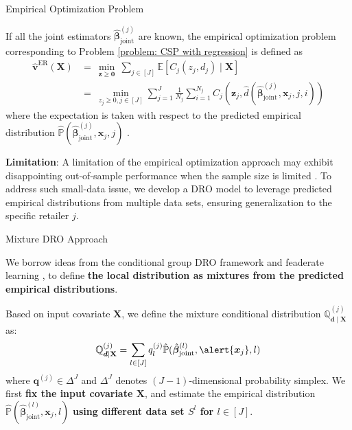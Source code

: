 \documentclass{beamer}
\newcommand{\mb}[1]{{\mathbf{#1}}}
\newcommand{\txrd}[1]{{\textcolor{sintefred}{\textbf{#1}}}}
\newcommand{\bbp}{\mathbb{P}}
\newcommand{\bbq}{\mathbb{Q}}
\begin{document}
\begin{frame}{Empirical Optimization Problem}

If all the joint estimators $\hat{\bm \beta}_{\text{joint}}^{(j)}$ are known, the empirical optimization problem corresponding to Problem \eqref{problem: CSP with regression} is defined as
{
\large
\begin{equation}
\begin{aligned}
\hat{\bm v}^{\text{ER}}({\mb X}) & = \ 
\min_{\bm z \geq \bm 0} \ \sum_{j \in [J]} \mathbb{E} \left[  C_j (z_j,  d_j)  \mid \mb X \right]
 \\
& = \ 
\min_{ z_j \geq 0, j\in[J]}
 \sum_{j=1}^J 
 \frac{1}{N_j} \sum_{i = 1}^{N_j} 
C_j \left( \bm z_j, \hat{d}(\hat{\bm \beta}_{\text{joint}}^{(j)}, \bm x_j, j, i)  \right) 
\label{problem: Empirical Optimization Problem}
\end{aligned}
\end{equation}
}
where the expectation is taken with respect to the predicted empirical distribution $\hat{\bbp}(\hat{\bm \beta}_{\text{joint}}^{(j)},\bm x_j, j)$ \citep{kannan2025data}. \\

\vspace{0.3cm}

\txrd{Limitation}: A limitation of the empirical optimization approach may exhibit disappointing out-of-sample performance when the sample size is limited \citep{kannan2024residuals}. To address such small-data issue, we develop a DRO model to leverage predicted empirical distributions from multiple data sets, ensuring generalization to the specific retailer $j$.

\end{frame}



\begin{frame}{Mixture DRO Approach}

We borrow ideas from the conditional group DRO framework and feaderate learning  \citep{marfoq2021federated, wang2025distributionally}, to define \txrd{the local distribution as mixtures from the predicted empirical distributions}. 

\vspace{0.3cm}
Based on input covariate $\mb X$, we define the mixture conditional distribution $\bbq^{(j)}_{\bm d \mid \mb X}$ as:
\[
\bbq^{(j)}_{\bm d \mid \mb X} = \sum_{l \in [J]} q_l^{(j)} \hat{\bbp}(\hat{\bm \beta}_{\text{joint}}^{(l)},\alert{\bm x_j}, l)
\]
where $\bm q^{(j)} \in \Delta^J$ and $\Delta^J$ denotes $(J-1)$-dimensional probability simplex.  We first \txrd{fix the input covariate $\mb X$}, and estimate the empirical distribution $\hat{\bbp}(\hat{\bm \beta}_{\text{joint}}^{(l)},\bm x_j, l)$ \txrd{using different data set $S^{l}$ for $l \in [J]$}.

\vspace{0.3cm}


\end{frame}
\end{document}
